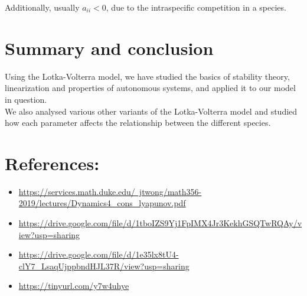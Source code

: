 \documentclass{article}
\begin{document}
Additionally, usually $a_{ii} < 0$, due to the intraspecific competition in a species.

\section{Summary and conclusion}
Using the Lotka-Volterra model, we have studied the basics of stability theory, linearization and properties of autonomous systems, and applied it to our model in question.\\
We also analysed various other variants of the Lotka-Volterra model and studied how each parameter affects the relationship between the different species.

\section{References:}
\begin{itemize}
    \item \href{https://services.math.duke.edu/~jtwong/math356-2019/lectures/Dynamics4_cons_lyapunov.pdf}{https://services.math.duke.edu/~jtwong/math356-2019/lectures/Dynamics4_cons_lyapunov.pdf}
    \item \href{https://drive.google.com/file/d/1tboIZS9Yj1FpIMX4Jr3KekhGSQTwRQAy/view?usp=sharing}{https://drive.google.com/file/d/1tboIZS9Yj1FpIMX4Jr3KekhGSQTwRQAy/view?usp=sharing}
    \item \href{https://drive.google.com/file/d/1e35lx8tU4-clY7_LsaqUjppbndHJL37R/view?usp=sharing}{https://drive.google.com/file/d/1e35lx8tU4-clY7_LsaqUjppbndHJL37R/view?usp=sharing}
    \item \href{https://tinyurl.com/y7w4uhye}{https://tinyurl.com/y7w4uhye}
\end{itemize}
\end{document}
